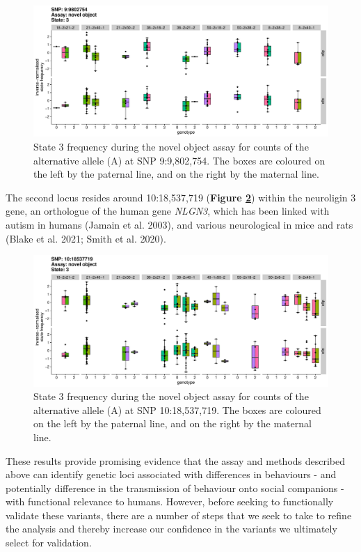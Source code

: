 \documentclass[
]{book}
\begin{document}
\begin{figure}
\includegraphics[width=1\linewidth]{figs/mikk_behaviour/sig_snps_boxplots/3-9:9802754} \caption{State 3 frequency during the novel object assay for counts of the alternative allele (A) at SNP 9:9,802,754. The boxes are coloured on the left by the paternal line, and on the right by the maternal line.}\label{fig:sig-snp-9-9mb}
\end{figure}

The second locus resides around 10:18,537,719 (\textbf{Figure \ref{fig:sig-snp-10-18mb}}) within the neuroligin 3 gene, an orthologue of the human gene \emph{NLGN3}, which has been linked with autism in humans (Jamain et al. 2003), and various neurological in mice and rats (Blake et al. 2021; Smith et al. 2020).



\begin{figure}
\includegraphics[width=1\linewidth]{figs/mikk_behaviour/sig_snps_boxplots/3-10:18537719} \caption{State 3 frequency during the novel object assay for counts of the alternative allele (A) at SNP 10:18,537,719. The boxes are coloured on the left by the paternal line, and on the right by the maternal line.}\label{fig:sig-snp-10-18mb}
\end{figure}

These results provide promising evidence that the assay and methods described above can identify genetic loci associated with differences in behaviours - and potentially difference in the transmission of behaviour onto social companions - with functional relevance to humans. However, before seeking to functionally validate these variants, there are a number of steps that we seek to take to refine the analysis and thereby increase our confidence in the variants we ultimately select for validation.
\end{document}
